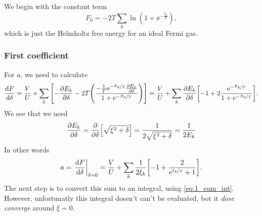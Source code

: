 \documentclass[11pt,letter, swedish, english
]{article}
\newcommand{\Tc}{\ensuremath{T_{\text{c}}}}
\begin{document}
We begin with the constant term
\begin{equation}
F_0=-2T\sum_k\ln(1+\ee^{-\frac{\xi_k}{T}}),
\end{equation}
which is just the Helmholtz free energy for an ideal Fermi gas.

\subsubsection{First coefficient}
For $a$, we need to calculate
\begin{equation}\label{eq:2a_dF/ddelta}
\dv{F}{\delta}=\frac{V}{U}
+\sum_k\qty[-\pdv{E_k}{\delta}
-2T\qty(\frac{-\frac{1}{T}\mathrm{e}^{-\nicefrac{E_k}{T}}\pdv{E_k}{\delta}}
{1+\mathrm{e}^{-\nicefrac{E_k}{T}}})]
=\frac{V}{U}
+\sum_k\pdv{E_k}{\delta}\qty[-1
+2\frac{\mathrm{e}^{-\nicefrac{E_k}{T}}}{1+\mathrm{e}^{-\nicefrac{E_k}{T}}}].
\end{equation}
We see that we need
\begin{equation}\label{eq:2a_dEk/ddelta}
\pdv{E_k}{\delta}=\pdv{\delta}\qty[\sqrt{\xi^2+\delta}]
=\frac{1}{2\sqrt{\xi^2+\delta}}=\frac{1}{2E_k}
\end{equation}
In other words
\begin{equation}\label{eq:2a_a1}
a=\eval{\dv{F}{\delta}}_{\delta=0}
=\frac{V}{U}
+\sum_k\frac{1}{2\xi_k}\qty[-1
+\frac{2}{\ee^{\nicefrac{\xi_k}{T}}+1}].
\end{equation}
The next step is to convert this sum to an integral, using
\eqref{eq:1_sum_int}. However, unfortunatly this integral dosen't can't be
evaluated, bot it \emph{dose converge} around $\xi=0$.

\end{document}
